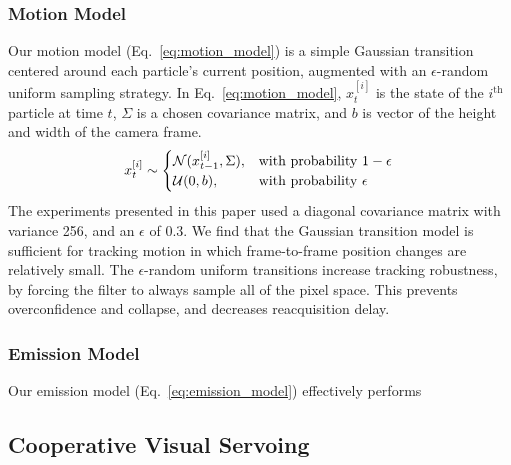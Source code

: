 \documentclass{aamas2013}
\begin{document}
\subsubsection{Motion Model}
Our motion model (Eq.~\ref{eq:motion_model}) is a simple Gaussian transition 
centered around each particle's current position, augmented with an 
$\epsilon$-random uniform sampling strategy. In Eq.~\ref{eq:motion_model}, 
$x^{[i]}_t$ is the state of the $i^\text{th}$ particle at time $t$, $\Sigma$ 
is a chosen covariance matrix, and $b$ is vector of the height and width of 
the camera frame.
\begin{equation}
\label{eq:motion_model}
x^{[i]}_t \sim \begin{cases}
\mathcal{N}(x^{[i]}_{t-1}, \Sigma), &\text{with probability } 1-\epsilon \\
\mathcal{U}(0,b),& \text{with probability } \epsilon \\
\end{cases}\\
\end{equation}
The experiments presented in this paper used a diagonal covariance matrix 
with variance 256, and an $\epsilon$ of 0.3. We find that the Gaussian 
transition model is sufficient for tracking motion in which frame-to-frame 
position changes are relatively small. The $\epsilon$-random uniform 
transitions increase tracking robustness, by forcing the filter to always 
sample all of the pixel space. This prevents overconfidence and collapse, 
and decreases reacquisition delay. 

\subsubsection{Emission Model}
Our emission model (Eq.~\ref{eq:emission_model}) effectively performs \naive



\subsection{Cooperative Visual Servoing}
\label{sec:visual_servoing_concept}
\end{document}
